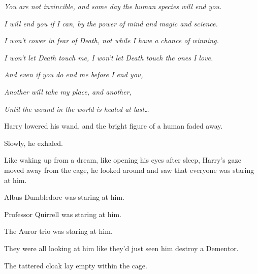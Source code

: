 \emph{You are not invincible, and some day the human species will end you.}

\emph{I will end you if I can, by the power of mind and magic and science.}

\emph{I won’t cower in fear of Death, not while I have a chance of winning.}

\emph{I won’t let Death touch me, I won’t let Death touch the ones I love.}

\emph{And even if you do end me before I end you,}

\emph{Another will take my place, and another,}

\emph{Until the wound in the world is healed at last…}

Harry lowered his wand, and the bright figure of a human faded away.

Slowly, he exhaled.

Like waking up from a dream, like opening his eyes after sleep, Harry’s gaze moved away from the cage, he looked around and saw that everyone was staring at him.

Albus Dumbledore was staring at him.

Professor Quirrell was staring at him.

The Auror trio was staring at him.

They were all looking at him like they’d just seen him destroy a Dementor.

The tattered cloak lay empty within the cage.

